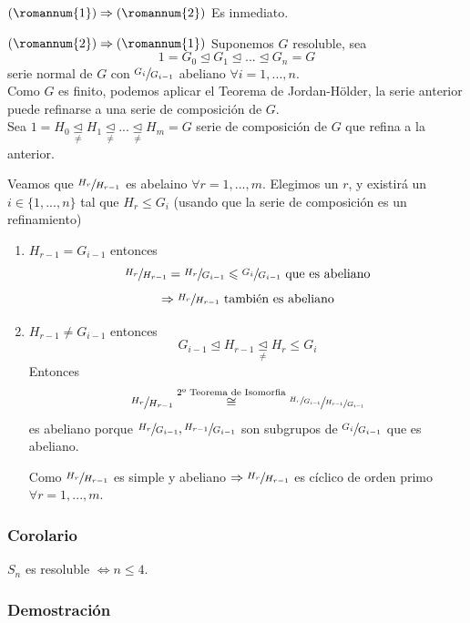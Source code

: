 \documentclass[11pt,a4paper]{article}
\begin{document}
\begin{enumerate*}
\item[$(\romannum{1}) \Rightarrow (\romannum{2})$] Es inmediato.
\item[$(\romannum{2}) \Rightarrow (\romannum{1})$] Suponemos $G$ resoluble, sea
$$1 = G_{0} \unlhd G_{1} \unlhd ... \unlhd G_{n} = G$$
serie normal de $G$ con $\sfrac{G_{i}}{G_{i-1}}$ abeliano $\forall i = 1,..., n$. \\
Como $G$ es finito, podemos aplicar el Teorema de Jordan-Hölder, la serie anterior puede refinarse a una serie de composición de $G$. \\
Sea $1 = H_{0} \underset{\neq}{\unlhd} H_{1} \underset{\neq}{\unlhd} ... \underset{\neq}{\unlhd} H_{m} = G$ serie de composición de $G$ que refina a la anterior.

Veamos que $\sfrac{H_{r}}{H_{r-1}}$ es abelaino $\forall r = 1, ..., m$. Elegimos un $r$, y existirá un $i \in \{1, ..., n\}$ tal que $H_{r} \leqslant G_{i}$ (usando que la serie de composición es un refinamiento)
\begin{enumerate}[label = Caso \arabic*:]
\item $H_{r-1} = G_{i-1}$ entonces
$$\sfrac{H_{r}}{H_{r-1}} = \sfrac{H_{r}}{G_{i-1}} \leqslant \sfrac{G_{i}}{G_{i-1}} \text{ que es abeliano}$$
$$\Rightarrow \sfrac{H_{r}}{H_{r-1}} \text{ también es abeliano}$$
\item $H_{r-1} \neq G_{i-1}$ entonces
$$G_{i-1} \unlhd H_{r-1} \underset{\neq}{\unlhd} H_{r} \leqslant G_{i}$$
Entonces
$$\sfrac{H_{r}}{H_{r-1}} \overset{\text{2º Teorema de Isomorfia}}{\cong} \sfrac{\sfrac{H_{r}}{G_{i-1}}}{\sfrac{H_{r-1}}{G_{i-1}}}$$
es abeliano porque $\sfrac{H_{r}}{G_{i-1}}, \sfrac{H_{r-1}}{G_{i-1}}$ son subgrupos de $\sfrac{G_{i}}{G_{i-1}}$ que es abeliano.

Como $\sfrac{H_{r}}{H_{r-1}}$ es simple y abeliano $\Rightarrow \sfrac{H_{r}}{H_{r-1}}$ es cíclico de orden primo $\forall r = 1, ..., m$.
\end{enumerate}
\end{enumerate*}

\subsubsection*{Corolario}

$S_{n}$ es resoluble $\iff n \leq 4$.

\subsubsection*{Demostración}
\end{document}
